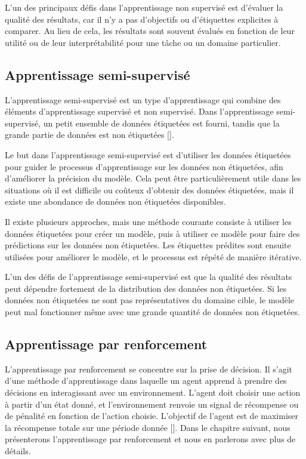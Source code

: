 \medskip
L'un des principaux défis dans l'apprentissage non supervisé est d'évaluer la qualité des résultats, car il n'y a pas d'objectifs ou d'étiquettes explicites à comparer. Au lieu de cela, les résultats sont souvent évalués en fonction de leur utilité ou de leur interprétabilité pour une tâche ou un domaine particulier.

\subsection{Apprentissage semi-supervisé}
L'apprentissage semi-supervisé est un type d'apprentissage qui combine des
éléments d'apprentissage supervisé et non supervisé. Dans l'apprentissage
semi-supervisé, un petit ensemble de données étiquetées est fourni, tandis que
la grande partie de données est non étiquetées [\cite{Goodfellow-et-al-2016}].

\medskip
Le but dans l'apprentissage semi-supervisé est d'utiliser les données étiquetées pour guider le processus d'apprentissage sur les données non étiquetées, afin d'améliorer la précision du modèle. Cela peut être particulièrement utile dans les situations où il est difficile ou coûteux d'obtenir des données étiquetées, mais il existe une abondance de données non étiquetées disponibles.

\medskip
Il existe plusieurs approches, mais une méthode courante consiste à utiliser les données étiquetées pour créer un modèle, puis à utiliser ce modèle pour faire des prédictions sur les données non étiquetées. Les étiquettes prédites sont ensuite utilisées pour améliorer le modèle, et le processus est répété de manière itérative.

\medskip
L'un des défis de l'apprentissage semi-supervisé est que la qualité des résultats peut dépendre fortement de la distribution des données non étiquetées. Si les données non étiquetées ne sont pas représentatives du domaine cible, le modèle peut mal fonctionner même avec une grande quantité de données non étiquetées.

\subsection{Apprentissage par renforcement}
L'apprentissage par renforcement se concentre sur la prise de décision. Il
s'agit d'une méthode d'apprentissage dans laquelle un agent apprend à prendre
des décisions en interagissant avec un environnement. L'agent doit choisir une
action à partir d'un état donné, et l'environnement renvoie un signal de
récompense ou de pénalité en fonction de l'action choisie. L'objectif de
l'agent est de maximiser la récompense totale sur une période donnée
[\cite{wiering2012reinforcement}]. Dans le chapitre suivant, nous présenterons
l'apprentissage par renforcement et nous en parlerons avec plus de détails.

